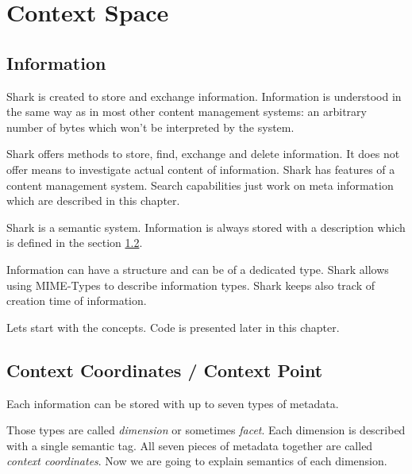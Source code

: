 \chapter{Context Space}
\label{sec:contextspace}
\section{Information}
Shark is created to store and exchange information. Information is understood in the same way as in most other content management systems: an arbitrary number of bytes which won't be interpreted by the system. 

Shark offers methods to store, find, exchange and delete information. It does not offer means to investigate actual content of information. Shark has features of a content management system. Search capabilities just work on meta information which are described in this chapter.

Shark is a semantic system. Information is always stored with a description which is defined in the section \ref{section:informationcontext}. 

Information can have a structure and can be of a dedicated type. Shark allows using MIME-Types to describe information types. Shark keeps also track of creation time of information.

Lets start with the concepts. Code is presented later in this chapter.

\section{Context Coordinates / Context Point}
\label{section:informationcontext}
Each information can be stored with up to seven types of metadata. 

Those types are called {\it dimension} or sometimes {\it facet}. Each dimension is described with a single semantic tag. All seven pieces of metadata together are called {\it context coordinates}. 
Now we are going to explain semantics of each dimension. 

